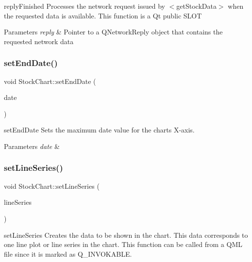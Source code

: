 reply\+Finished Processes the network request issued by $<$get\+Stock\+Data$>$ when the requested data is available. This function is a Qt public S\+L\+OT 


\begin{DoxyParams}{Parameters}
{\em reply} & Pointer to a Q\+Network\+Reply object that contains the requested network data \\
\hline
\end{DoxyParams}
\mbox{\label{class_stock_chart_a99d57c44a0bd5e91e2e810bec071f7db}} 
\subsubsection{\texorpdfstring{set\+End\+Date()}{setEndDate()}}
{\footnotesize\ttfamily void Stock\+Chart\+::set\+End\+Date (\begin{DoxyParamCaption}\item[{const Q\+String \&}]{date }\end{DoxyParamCaption})}



set\+End\+Date Sets the maximum date value for the chart\textquotesingle{}s X-\/axis. 


\begin{DoxyParams}{Parameters}
{\em date} & \\
\hline
\end{DoxyParams}
\mbox{\label{class_stock_chart_a263508e678183faf4ce6a98ecab71405}} 
\subsubsection{\texorpdfstring{set\+Line\+Series()}{setLineSeries()}}
{\footnotesize\ttfamily void Stock\+Chart\+::set\+Line\+Series (\begin{DoxyParamCaption}\item[{Q\+Line\+Series $\ast$}]{line\+Series }\end{DoxyParamCaption})}



set\+Line\+Series Creates the data to be shown in the chart. This data corresponds to one line plot or line series in the chart. This function can be called from a Q\+ML file since it is marked as Q\+\_\+\+I\+N\+V\+O\+K\+A\+B\+LE. 


